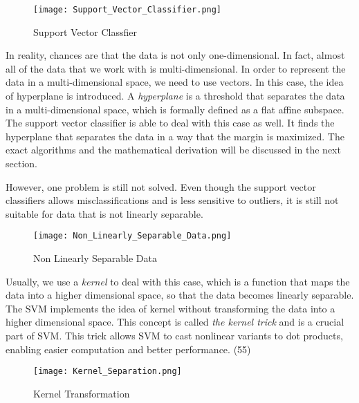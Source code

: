 \begin{figure}[h]%
    \begin{center}%
        \texttt{[image: Support\_Vector\_Classifier.png]}%
        \caption{Support Vector Classfier}\label{fig:}%
    \end{center}%
\end{figure}

In reality, chances are that the data is not only one-dimensional. In fact, almost all of the data that we work with
is multi-dimensional. In order to represent the data in a multi-dimensional space, we need to use vectors. In this case,
the idea of hyperplane is introduced. A \emph{hyperplane} is a threshold that separates the data in a multi-dimensional space,
which is formally defined as a flat affine subspace.\cite{elements} The support vector classifier is able to deal with this case as well.
It finds the hyperplane that separates the data in a way that the margin is maximized. The exact algorithms and the
mathematical derivation will be discussed in the next section.

However, one problem is still not solved. Even though the support vector classifiers allows misclassifications and is less
sensitive to outliers, it is still not suitable for data that is not linearly separable. 
\begin{figure}[h]%
    \begin{center}%
        \texttt{[image: Non\_Linearly\_Separable\_Data.png]}%
        \caption{Non Linearly Separable Data}\label{fig:}%
    \end{center}%
\end{figure}

Usually, we use a \emph{kernel} to deal 
with this case, which is a function that maps the data into a higher dimensional space, so that the data becomes linearly
separable. The SVM implements the idea of kernel without transforming the data into a higher dimensional space. This concept is 
called \emph{the kernel trick} and is a crucial part of SVM. This trick allows SVM to cast nonlinear variants to dot products,
enabling easier computation and better performance. (55)\cite{kernel}
\begin{figure}[h]%
    \begin{center}%
        \texttt{[image: Kernel\_Separation.png]}%
        \caption{Kernel Transformation}\label{fig:}%
    \end{center}%
\end{figure}
